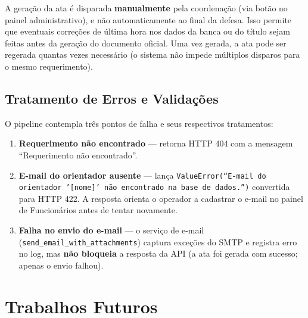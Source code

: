 \documentclass[12pt,a4paper]{report}
\begin{document}
\begin{insight}[title=Geração sob demanda vs.\ automática]
A geração da ata é disparada \textbf{manualmente} pela coordenação (via botão
no painel administrativo), e não automaticamente ao final da defesa. Isso
permite que eventuais correções de última hora nos dados da banca ou do título
sejam feitas antes da geração do documento oficial. Uma vez gerada, a ata pode
ser regerada quantas vezes necessário (o sistema não impede múltiplos disparos
para o mesmo requerimento).
\end{insight}

\section{Tratamento de Erros e Validações}

O pipeline contempla três pontos de falha e seus respectivos tratamentos:

\begin{enumerate}
  \item \textbf{Requerimento não encontrado} — retorna HTTP 404 com a mensagem
        ``Requerimento não encontrado''.
  \item \textbf{E-mail do orientador ausente} — lança
        \texttt{ValueError(``E-mail do orientador '[nome]' não encontrado na
        base de dados.'')} convertida para HTTP 422. A resposta orienta o
        operador a cadastrar o e-mail no painel de Funcionários antes de tentar
        novamente.
  \item \textbf{Falha no envio do e-mail} — o serviço de e-mail
        (\texttt{send\_email\_with\_attachments}) captura exceções do SMTP e
        registra erro no log, mas \textbf{não bloqueia} a resposta da API (a
        ata foi gerada com sucesso; apenas o envio falhou).
\end{enumerate}

\chapter{Trabalhos Futuros}
\end{document}
